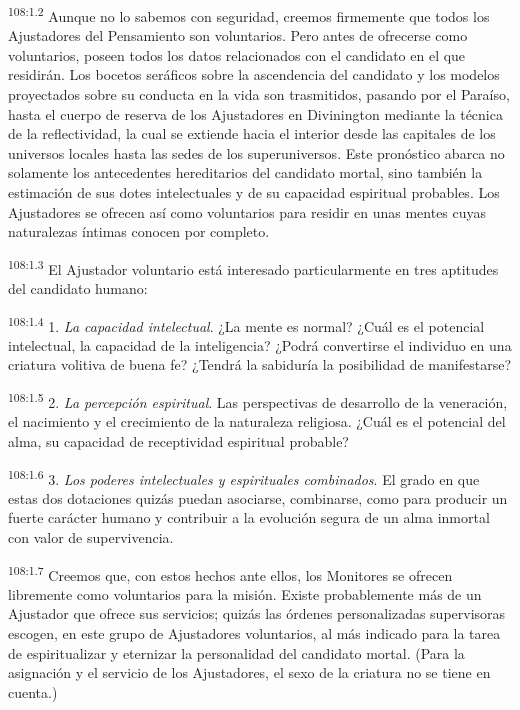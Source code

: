 \documentclass[twoside, 11pt]{book}
\begin{document}
\par
\textsuperscript{108:1.2} Aunque no lo sabemos con seguridad, creemos firmemente que todos los Ajustadores del Pensamiento son voluntarios. Pero antes de ofrecerse como voluntarios, poseen todos los datos relacionados con el candidato en el que residirán. Los bocetos seráficos sobre la ascendencia del candidato y los modelos proyectados sobre su conducta en la vida son trasmitidos, pasando por el Paraíso, hasta el cuerpo de reserva de los Ajustadores en Divinington mediante la técnica de la reflectividad, la cual se extiende hacia el interior desde las capitales de los universos locales hasta las sedes de los superuniversos. Este pronóstico abarca no solamente los antecedentes hereditarios del candidato mortal, sino también la estimación de sus dotes intelectuales y de su capacidad espiritual probables. Los Ajustadores se ofrecen así como voluntarios para residir en unas mentes cuyas naturalezas íntimas conocen por completo.

\par
\textsuperscript{108:1.3} El Ajustador voluntario está interesado particularmente en tres aptitudes del candidato humano:

\par
\textsuperscript{108:1.4} 1. \textit{La capacidad intelectual}. ¿La mente es normal? ¿Cuál es el potencial intelectual, la capacidad de la inteligencia? ¿Podrá convertirse el individuo en una criatura volitiva de buena fe? ¿Tendrá la sabiduría la posibilidad de manifestarse?

\par
\textsuperscript{108:1.5} 2. \textit{La percepción espiritual}. Las perspectivas de desarrollo de la veneración, el nacimiento y el crecimiento de la naturaleza religiosa. ¿Cuál es el potencial del alma, su capacidad de receptividad espiritual probable?

\par
\textsuperscript{108:1.6} 3. \textit{Los poderes intelectuales y espirituales combinados}. El grado en que estas dos dotaciones quizás puedan asociarse, combinarse, como para producir un fuerte carácter humano y contribuir a la evolución segura de un alma inmortal con valor de supervivencia.

\par
\textsuperscript{108:1.7} Creemos que, con estos hechos ante ellos, los Monitores se ofrecen libremente como voluntarios para la misión. Existe probablemente más de un Ajustador que ofrece sus servicios; quizás las órdenes personalizadas supervisoras escogen, en este grupo de Ajustadores voluntarios, al más indicado para la tarea de espiritualizar y eternizar la personalidad del candidato mortal. (Para la asignación y el servicio de los Ajustadores, el sexo de la criatura no se tiene en cuenta.)
\end{document}

